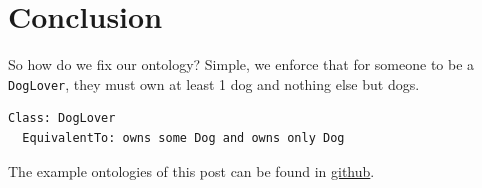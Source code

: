 \documentclass{amsart}
\begin{document}
  \section{Conclusion} 
So how do we fix our ontology? Simple, we enforce that for someone to be a \texttt{DogLover}, they must own at least 1 dog and nothing else but dogs.  
\begin{small}
\begin{verbatim} 
Class: DogLover
  EquivalentTo: owns some Dog and owns only Dog
\end{verbatim}
\end{small}   

The example ontologies of this post can be found in \href{https://github.com/henrietteharmse/henrietteharmse/tree/master/blog/tutorial/ontologies/docs/Understanding%20OWL%20Universal%20Property%20Restrictions}{github}.

  
  
 
\end{document}
